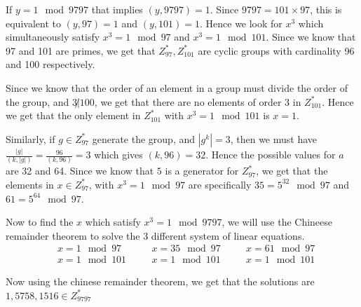 \documentclass[12pt]{exam}
\theoremstyle{plain} %
\theoremstyle{definition} %
\theoremstyle{remark} %
\begin{document}
\begin{questions}
  \question
  \begin{solution}
    If $y = 1 \mod 9797$ that implies $(y, 9797) = 1$. Since $9797 = 101 \times 97$, this is equivalent to $(y, 97) = 1$ and $(y, 101) = 1$. Hence we look for $x^3$ which simultaneously satisfy $x^3 = 1 \mod 97$ and $x^3 = 1 \mod 101$. Since we know that 97 and 101 are primes, we get that $Z_{97}^{*}, Z_{101}^{*}$ are cyclic groups with cardinality 96 and 100 respectively. 

    Since we know that the order of an element in a group must divide the order of the group, and $3 \not |100$, we get that there are no elements of order 3 in $Z_{101}^{*}$. Hence we get that the only element in $Z_{101}^{*}$ with $x^3 = 1 \mod 101$ is $x = 1$.

    Similarly, if $g \in Z_{97}^{*}$ generate the group, and $|g^k| = 3$, then we must have $ \frac{|g|}{(k, |g|)} = \frac{96}{(k, 96)} = 3$ which gives $(k, 96) = 32$. Hence the possible values for $a$ are 32 and 64. Since we know that $5$ is a generator for $Z_{97}^{*}$, we get that the elements in $x \in Z_{97}^{*}$, with $x^3 = 1 \mod 97$ are specifically $35 = 5^{32} \mod 97$ and $61 = 5^{64} \mod 97$.

    Now to find the $x$ which satisfy $x^3 = 1 \mod 9797$, we will use the Chineese remainder theorem to solve the 3 different system of linear equations. \begin{align*}
      &x = 1 \mod 97& \quad &x = 35 \mod 97& \quad &x = 61 \mod 97 \\
      &x = 1 \mod 101& \quad  &x = 1 \mod 101& \quad &x = 1 \mod 101
    \end{align*}

    Now using the chinese remainder theorem, we get that the solutions are $1, 5758, 1516 \in Z_{9797}^{*}$

  \end{solution}

\end{questions}
\printbibliography[heading=bibintoc]
\end{document}
